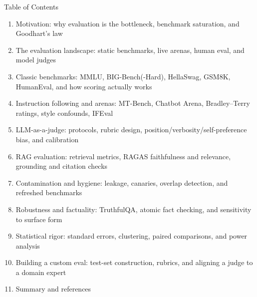 \begin{frame}{Table of Contents}
  \begin{enumerate}\itemsep0.1em\footnotesize
    \item Motivation: why evaluation is the bottleneck, benchmark saturation, and Goodhart's law
    \item The evaluation landscape: static benchmarks, live arenas, human eval, and model judges
    \item Classic benchmarks: MMLU, BIG-Bench(-Hard), HellaSwag, GSM8K, HumanEval, and how scoring actually works
    \item Instruction following and arenas: MT-Bench, Chatbot Arena, Bradley--Terry ratings, style confounds, IFEval
    \item LLM-as-a-judge: protocols, rubric design, position/verbosity/self-preference bias, and calibration
    \item RAG evaluation: retrieval metrics, RAGAS faithfulness and relevance, grounding and citation checks
    \item Contamination and hygiene: leakage, canaries, overlap detection, and refreshed benchmarks
    \item Robustness and factuality: TruthfulQA, atomic fact checking, and sensitivity to surface form
    \item Statistical rigor: standard errors, clustering, paired comparisons, and power analysis
    \item Building a custom eval: test-set construction, rubrics, and aligning a judge to a domain expert
    \item Summary and references
  \end{enumerate}
\end{frame}
